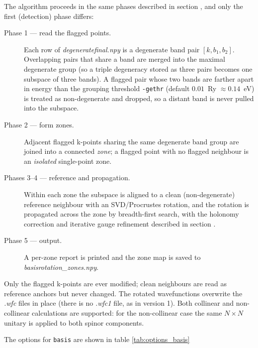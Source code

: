 \documentclass[a4paper,12pt]{report}
\begin{document}
 The algorithm proceeds in the same phases described in section , and only
 the first (detection) phase differs:

 \begin{description}
   \item[Phase 1 --- read the flagged points.] Each row of \emph{degeneratefinal.npy} is a
     degenerate band pair $[k, b_1, b_2]$. Overlapping pairs that share a band are merged into
     the maximal degenerate group (so a triple degeneracy stored as three pairs becomes one
     subspace of three bands). A flagged pair whose two bands are farther apart in energy than
     the grouping threshold \texttt{-gethr} (default $0.01$~Ry $\approx 0.14$~eV) is treated as non-degenerate and
     dropped, so a distant band is never pulled into the subspace.
   \item[Phase 2 --- form zones.] Adjacent flagged k-points sharing the same degenerate band
     group are joined into a connected \emph{zone}; a flagged point with no flagged neighbour is
     an \emph{isolated} single-point zone.
   \item[Phases 3--4 --- reference and propagation.] Within each zone the subspace is aligned to a
     clean (non-degenerate) reference neighbour with an SVD/Procrustes rotation, and the rotation
     is propagated across the zone by breadth-first search, with the holonomy correction and
     iterative gauge refinement described in section .
   \item[Phase 5 --- output.] A per-zone report is printed and the zone map is saved to
     \emph{basisrotation\_zones.npy}.
 \end{description}

 Only the flagged k-points are ever modified; clean neighbours are read as reference anchors but
 never changed. The rotated wavefunctions overwrite the \emph{.wfc} files in place
 (there is no \emph{.wfc1} file, as in version 1). Both collinear and non-collinear calculations are supported: for
 the non-collinear case the same $N\times N$ unitary is applied to both spinor components.

The options for \texttt{basis} are shown in table \ref{tab:options_basis}
\end{document}
